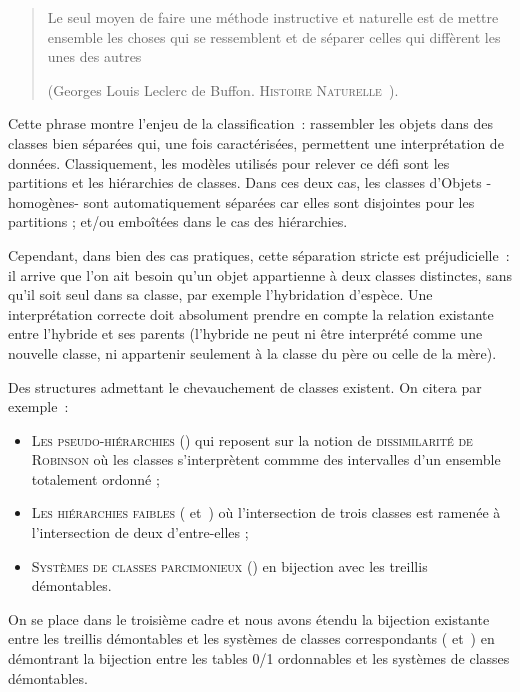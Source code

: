 \documentclass[a4paper]{report}
\begin{document}
\label{intro}

\begin{verse}
\og Le seul moyen de faire une méthode instructive et naturelle est de mettre ensemble les choses qui se ressemblent et de séparer celles qui diffèrent
les unes des autres\fg 

(Georges Louis Leclerc de Buffon. \textsc{Histoire Naturelle}~\cite{histoire}).
\end{verse}
Cette phrase montre l'enjeu de la classification~: rassembler les objets dans des classes bien séparées qui, une fois caractérisées, permettent 
une interprétation de données. Classiquement, les modèles utilisés pour relever ce défi sont les partitions et les hiérarchies de classes. Dans ces deux cas, les classes
 d'Objets -homogènes- sont automatiquement séparées car elles sont disjointes pour les partitions ; et/ou embo\^itées dans le cas des hiérarchies.

Cependant, dans bien des cas pratiques, cette séparation stricte est préjudi\-cielle~: il arrive que l'on ait besoin qu'un objet appartienne à deux classes distinctes, sans qu'il soit
 seul dans sa classe, par exemple l'hybridation d'espèce. Une interprétation correcte doit absolument prendre en compte la relation existante entre l'hybride 
et ses parents (l'hybride ne peut ni \^etre interprété comme une nouvelle classe, ni appartenir seulement à la classe du père ou celle de la mère).

Des structures admettant le chevauchement  de classes existent. On citera par exemple~:
\begin{itemize}
 \item \textsc{Les pseudo-hiérarchies} (\cite{dur}) qui reposent sur la notion de \textsc{dissimilarité de Robinson} où les classes s'interprètent commme
 des intervalles d'un ensemble totalement ordonné ;
\item \textsc{Les hiérarchies faibles} (\cite{dia} et~\cite{band}) où l'intersection de trois classes est ramenée à l'intersection de deux d'entre-elles ;
\item \textsc{Systèmes de classes parcimonieux} (\cite{par_clu}) en bijection avec les treillis démon\-tables.
\end{itemize}


On se place dans le troisième cadre et nous avons étendu la bijection existante entre les treillis démontables 
et les systèmes de classes correspondants (\cite{crow_free} et~\cite{par_clu}) en démontrant la bijection entre les tables 0/1
 ordonnables et les systèmes de classes démontables.
\end{document}
